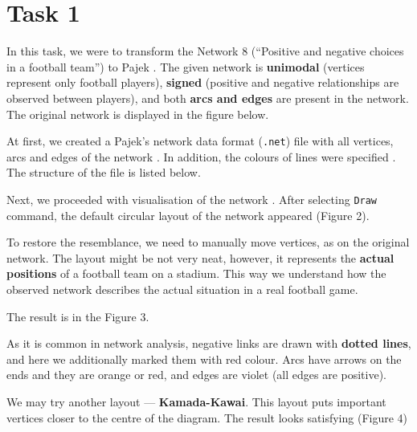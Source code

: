 \section{Task 1}
In this task, we were to transform the Network 8 (“Positive and negative choices in a football team”) to Pajek \cite{Pfeffer2019}. The given network is \textbf{unimodal} (vertices represent only football players), \textbf{signed} (positive and negative relationships are observed between players), and both \textbf{arcs and edges} are present in the network. The original network is displayed in the figure below.


At first, we created a Pajek’s network data format (\texttt{.net}) file with all vertices, arcs and edges of the network \cite{batagelj_ppt_2002}. In addition, the colours of lines were specified \cite{manual2022}. The structure of the file is listed below.



Next, we proceeded with visualisation of the network \cite{pajek_workshop}. After selecting \texttt{Draw} command, the default circular layout of the network appeared (Figure 2). 


To restore the resemblance, we need to manually move vertices, as on the original network. The layout might be not very neat, however, it represents the \textbf{actual positions} of a football team on a stadium. This way we understand how the observed network describes the actual situation in a real football game. 

The result is in the Figure 3.


As it is common in network analysis, negative links are drawn with \textbf{dotted lines}, and here we additionally marked them with red colour. Arcs have arrows on the ends and they are orange or red, and edges are violet (all edges are positive).

We may try another layout — \textbf{Kamada-Kawai}. This layout puts important vertices closer to the centre of the diagram. The result looks satisfying (Figure 4)


\clearpage



